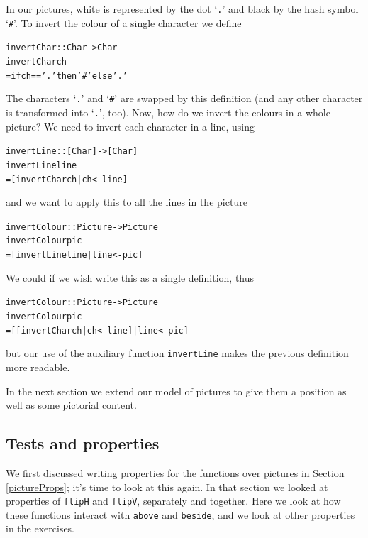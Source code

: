 In our pictures, white is represented by the dot `\texttt{.}' and black
by the hash symbol `\texttt{\#}'. To invert the colour of a single
character we define
\begin{alltt}
invertChar :: Char -> Char
invertChar ch 
  = if ch=='.' then '\#' else '.'
\end{alltt}
The characters `\texttt{.}' and `\texttt{\#}' are swapped by this
definition (and any other character is transformed into `\texttt{.}',
too).
Now, how do we invert the colours in a whole picture? We need to invert
each character in a line, using  
\begin{alltt}
invertLine :: [Char] -> [Char]
invertLine line 
  = [ invertChar ch | ch <- line ]
\end{alltt}
and we want to apply this to all the lines in the picture
\begin{alltt}
invertColour :: Picture -> Picture
invertColour pic 
  = [ invertLine line | line <- pic ]
\end{alltt}
We could if we wish write this as a single definition, thus
\begin{alltt}
invertColour :: Picture -> Picture
invertColour pic 
  = [ [ invertChar ch | ch <- line ] | line <- pic ]
\end{alltt}
but our use of the auxiliary function \texttt{invertLine} makes the
previous
definition more readable.

In the next section we extend our model of pictures to give them a position as well
as some pictorial content.


\subsection*{Tests and properties}

We first discussed writing properties for the functions over pictures in Section \ref{pictureProps}; it's time to look at this again. In that section we looked at properties  of \texttt{flipH} and \texttt{flipV}, separately and together. Here we look at how these functions interact with \texttt{above} and \texttt{beside}, and we look at other properties in the exercises.

